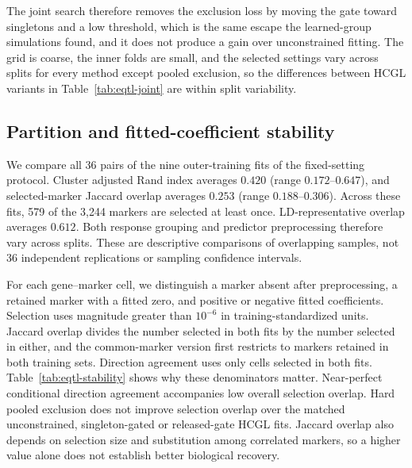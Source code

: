 \documentclass[lineno,pdflatex,sn-basic]{sn-jnl}
\theoremstyle{thmstyleone}
\begin{document}
The joint search therefore removes the exclusion loss by moving the gate
toward singletons and a low threshold, which is the same escape the
learned-group simulations found, and it does not produce a gain over
unconstrained fitting. The grid is coarse, the inner folds are small, and the
selected settings vary across splits for every method except pooled
exclusion, so the differences between HCGL variants in
Table~\ref{tab:eqtl-joint} are within split variability.

\subsection{Partition and fitted-coefficient stability}\label{sec:eqtl-stability}

We compare all 36 pairs of the nine outer-training fits of the fixed-setting
protocol. Cluster adjusted Rand
index averages $0.420$ (range $0.172$--$0.647$), and selected-marker Jaccard overlap
averages $0.253$ (range $0.188$--$0.306$). Across these fits, 579 of the 3,244
markers are selected at least once. LD-representative overlap averages $0.612$.
Both response grouping and predictor preprocessing therefore vary across splits.
These are descriptive comparisons of overlapping samples, not 36 independent
replications or sampling confidence intervals.

For each gene--marker cell, we distinguish a marker absent after preprocessing,
a retained marker with a fitted zero, and positive or negative fitted
coefficients. Selection uses magnitude greater than $10^{-6}$ in
training-standardized units. Jaccard overlap divides the number selected in
both fits by the number selected in either, and the common-marker version first
restricts to markers retained in both training sets. Direction agreement uses
only cells selected in both fits. Table~\ref{tab:eqtl-stability} shows why these
denominators matter. Near-perfect conditional direction agreement accompanies
low overall selection overlap. Hard pooled exclusion does not improve selection
overlap over the matched unconstrained, singleton-gated or released-gate HCGL fits.
Jaccard overlap also depends on selection size and substitution among correlated
markers, so a higher value alone does not establish better biological recovery.
\end{document}
